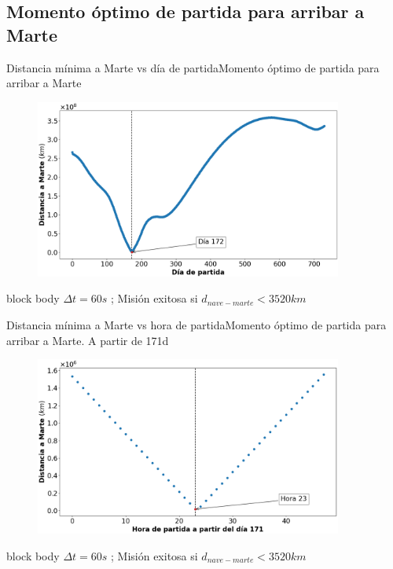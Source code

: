 \documentclass{beamer}
\begin{document}
        \subsection{Momento óptimo de partida para arribar a Marte}

            \begin{frame}{Distancia mínima a Marte vs día de partida}{Momento óptimo de partida para arribar a Marte}
                \begin{figure}[H!]
                    \includegraphics[width=0.9\textwidth]{./distancia_a_marte_vs_dia_de_partida}
                    \label{fig:marte_5}
                \end{figure}
                \begin{beamercolorbox}[sep=5pt,center]{block body}
                    \centering
                    \small{$\Delta t = 60s$ ; Misión exitosa si $d_{nave-marte} < 3520 km$}
                \end{beamercolorbox}
            \end{frame}

            \begin{frame}{Distancia mínima a Marte vs hora de partida}{Momento óptimo de partida para arribar a Marte. A partir de 171d}
                \begin{figure}[H!]
                    \includegraphics[width=0.9\textwidth]{./distancia_a_marte_vs_hora_de_partida}
                    \label{fig:marte_6}
                \end{figure}
                \begin{beamercolorbox}[sep=5pt,center]{block body}
                    \centering
                    \small{$\Delta t = 60s$ ; Misión exitosa si $d_{nave-marte} < 3520 km$}
                \end{beamercolorbox}
            \end{frame}
\end{document}
